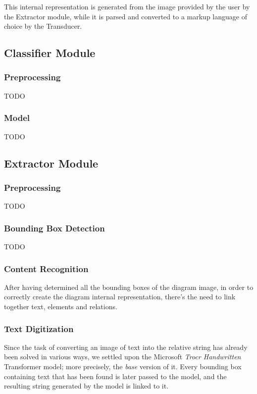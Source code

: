 \documentclass[conference]{IEEEtran}
\begin{document}
This internal representation is generated from the image provided by the user by the Extractor module, while it is parsed and converted to a markup language of choice by the Transducer. 

\subsection{Classifier Module}
\subsubsection{Preprocessing}
TODO \\

\subsubsection{Model}
TODO \\

\subsection{Extractor Module}
\subsubsection{Preprocessing}
TODO\\
\subsubsection{Bounding Box Detection}
TODO\\
\subsubsection{Content Recognition}
After having determined all the bounding boxes of the diagram image, in order to correctly create the diagram internal representation, there's the need to link together text, elements and relations.\\

\subsubsection{Text Digitization}
Since the task of converting an image of text into the relative string has already been solved in various ways, we settled upon the Microsoft \textit{Trocr Handwritten} Transformer model; more precisely, the \textit{base} version of it. Every bounding box containing text that has been found is later passed to the model, and the resulting string generated by the model is linked to it.\\
\end{document}
